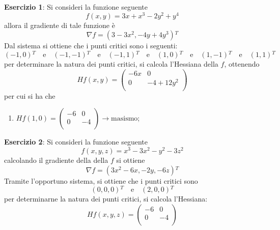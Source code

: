 \documentclass[a4paper]{extarticle}
\begin{document}
\vspace{1em}
\noindent
\textbf{Esercizio 1}: Si consideri la funzione seguente
\[f(x,y) = 3x+x^3-2y^2+y^4\]
allora il gradiente di tale funzione è
\[\nabla f = \left(3-3x^2,-4y+4y^3\right){^T}\]
Dal sistema si ottiene che i punti critici sono i seguenti:
\[(-1,0){^T} \hspace{1em} \text{e} \hspace{1em} (-1,-1){^T} \hspace{1em} \text{e} \hspace{1em} (-1,1){^T} \hspace{1em} \text{e} \hspace{1em} (1,0){^T} \hspace{1em} \text{e} \hspace{1em} (1,-1){^T} \hspace{1em} \text{e} \hspace{1em} (1,1){^T}\]
per determinare la natura dei punti critici, si calcola l'Hessiana della $f$, ottenendo
\[H f(x,y) = \left(
    \begin{array}{cc}
        -6x & 0\\
        0 & -4+12y^2\\
    \end{array}
    \right)
\]
per cui si ha che
\begin{enumerate}
    \item $\displaystyle{
        H f(1,0) = \left(
            \begin{array}{cc}
                -6 & 0\\
                0 & -4\\
            \end{array}
            \right)
    } \rightarrow \text{masismo}$;
\end{enumerate}

\vspace{2em}
\noindent
\textbf{Esercizio 2}: Si consideri la funzione seguente
\[f(x,y,z) = x^3 - 3x^2 - y^2 - 3z^2\]
calcolando il gradiente della della $f$ si ottiene
\[\nabla f = \left(3x^2 - 6x, -2y, -6z\right){^T}\]
Tramite l'opportuno sistema, si ottiene che i punti critici sono
\[(0,0,0){^T} \hspace{1em} \text{e} \hspace{1em} (2,0,0){^T}\]
per determinarne la natura dei punti critici, si calcola l'Hessiana:
\[
    H f(x,y,z) = \left(
        \begin{array}{cc}
            -6 & 0\\
            0 & -4\\
        \end{array}
        \right)
\]
\end{document}
